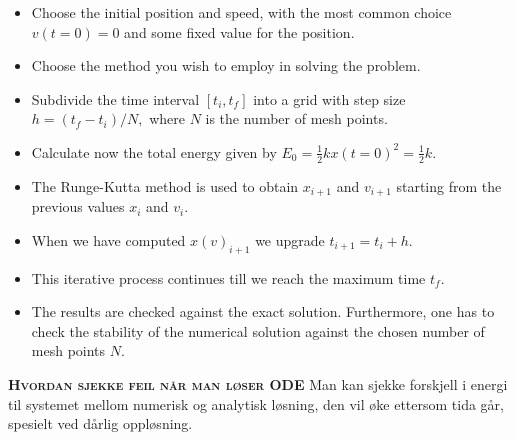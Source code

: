 \documentclass[12pt,a4paper,twocolumn]{article}
\begin{document}
\begin{flushleft}
\begin{itemize}
 \item Choose the initial position and speed, with the most common choice \( v(t=0)=0 \) and some fixed value for the position.
 \item Choose the method you wish to employ in solving the problem.
 \item Subdivide the time interval \( [t_i,t_f]  \) into a grid with step size $h=(t_f-t_i)/N, $ where \( N \) is the number of mesh points.
 \item Calculate now the total energy given by $E_0=\frac{1}{2}kx(t=0)^2=\frac{1}{2}k.$
 \item The Runge-Kutta method is used to obtain \( x_{i+1} \) and \( v_{i+1} \) starting from the previous values \( x_i \) and \( v_i \).
 \item When we have computed \( x(v)_{i+1} \) we upgrade  \( t_{i+1}=t_i+h \).
 \item This iterative  process continues till we reach the maximum time \( t_f \).
 \item The results are checked against the exact solution. Furthermore, one has to check the stability of the numerical solution against the chosen number of mesh points \( N \).
\end{itemize}
\textbf{\textsc{Hvordan sjekke feil når man løser ODE}} Man kan sjekke forskjell i energi til systemet mellom numerisk og analytisk løsning, den vil øke ettersom tida går, spesielt ved dårlig oppløsning.


\end{flushleft}
\end{document}
